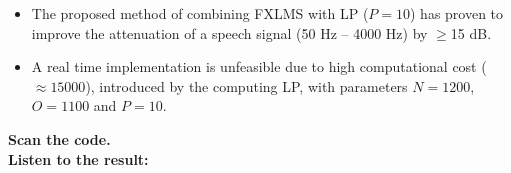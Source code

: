 \large
\begin{itemize}
	\item The proposed method of combining FXLMS with LP ($P=10$) has proven to improve the attenuation of a speech signal (50 Hz -- 4000 Hz) by  $\geq$15 dB. \\
	\item A real time implementation is unfeasible due to high computational cost ($\approx15000$), introduced by the computing LP, with parameters $N=1200$, $O=1100$ and $P=10$. \\
\end{itemize}
 \begin{minipage}{.8\columnwidth}
 	\begin{center}
	 	\textbf{Scan the code.}\\
	 	\textbf{Listen to the result:}
 	\end{center}
 \end{minipage}%
 \begin{minipage}{0.2\columnwidth}
 \end{minipage}